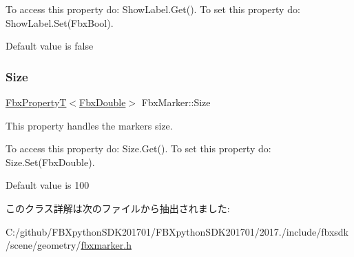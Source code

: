 To access this property do\+: Show\+Label.\+Get(). To set this property do\+: Show\+Label.\+Set(\+Fbx\+Bool).

Default value is false \mbox{\label{class_fbx_marker_af2ee6f3a36ab8b34bde07450aca06f04}} 
\subsubsection{\texorpdfstring{Size}{Size}}
{\footnotesize\ttfamily \hyperlink{class_fbx_property_t}{Fbx\+PropertyT}$<$\hyperlink{fbxtypes_8h_a171e72a1c46fc15c1a6c9c31948c1c5b}{Fbx\+Double}$>$ Fbx\+Marker\+::\+Size}

This property handles the marker\textquotesingle{}s size.

To access this property do\+: Size.\+Get(). To set this property do\+: Size.\+Set(\+Fbx\+Double).

Default value is 100 

このクラス詳解は次のファイルから抽出されました\+:\begin{DoxyCompactItemize}
\item 
C\+:/github/\+F\+B\+Xpython\+S\+D\+K201701/\+F\+B\+Xpython\+S\+D\+K201701/2017./include/fbxsdk/scene/geometry/\hyperlink{fbxmarker_8h}{fbxmarker.\+h}\end{DoxyCompactItemize}
